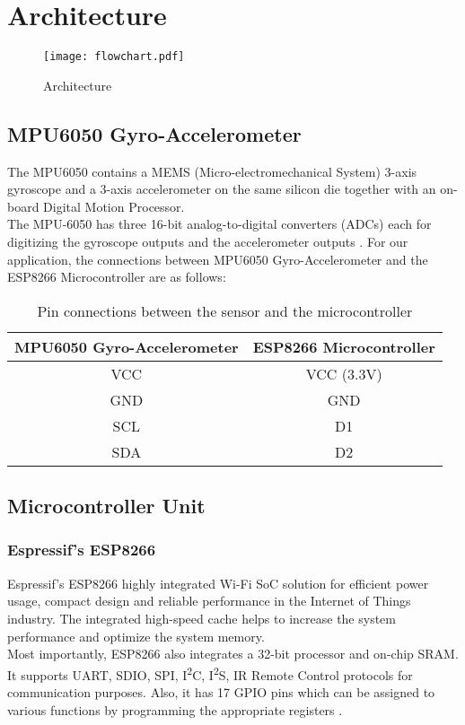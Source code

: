 \documentclass[./main.tex]{subfiles}
\begin{document}
\chapter{Architecture}\label{chap:arch}
\begin{figure}[H]
    \centering
    \texttt{[image: flowchart.pdf]}
    \caption{Architecture}
    \label{fig:architecture}
\end{figure}

\section{MPU6050 Gyro-Accelerometer}\label{sec:archmpu}
The MPU6050 contains a MEMS (Micro-electromechanical System) 3-axis gyroscope
and a 3-axis accelerometer on the same silicon die together with an on-board
Digital Motion Processor. \\ The MPU-6050 has three 16-bit analog-to-digital
converters (ADCs) each for digitizing the gyroscope outputs and the
accelerometer outputs \cite{mpudata}. For our application, the connections
between MPU6050 Gyro-Accelerometer and the ESP8266 Microcontroller are as
follows:

\begin{table}[H]
    \centering
    \begin{tabular}{|c|c|}
    \hline
    MPU6050 Gyro-Accelerometer & ESP8266 Microcontroller \\
    \hline
    VCC & VCC (3.3V) \\
    GND & GND \\
    SCL & D1 \\
    SDA & D2 \\
    \hline
    \end{tabular}
    \caption{Pin connections between the sensor and the microcontroller}
    \label{tab:pin}
\end{table}

\section{Microcontroller Unit}\label{sec:archuc}
\subsection{Espressif's ESP8266}
Espressif’s ESP8266 highly integrated Wi-Fi SoC solution for efficient power
usage, compact design and reliable performance in the Internet of Things
industry. The integrated high-speed cache helps to increase the system
performance and optimize the system memory. \\ Most importantly, ESP8266 also
integrates a 32-bit processor and on-chip SRAM.  It supports UART, SDIO, SPI,
I\textsuperscript{2}C, I\textsuperscript{2}S, IR Remote Control protocols for
communication purposes.  Also, it has 17 GPIO pins which can be assigned to
various functions by programming the appropriate registers \cite{espdata}.
\end{document}
